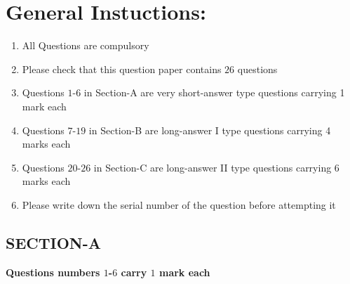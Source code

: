 \documentclass[a4paper,12pt]{article}
\begin{document}
\section*{\textbf{General Instuctions: }}
\begin{enumerate}[label=(\roman*)]
    \item All Questions are compulsory
    \item Please check that this question paper contains $26$ questions 
    \item Questions $1$-$6$ in Section-A are very short-answer type questions carrying 1 mark each
    \item Questions $7$-$19$ in Section-B are long-answer I type questions carrying 4 marks each
    \item Questions $20$-$26$ in Section-C are long-answer II type questions carrying 6 marks each
    \item Please write down the serial number of the question before attempting it
\end{enumerate}
\begin{center}
	\section*{\large \textbf{SECTION-A}}
	\textbf{Questions numbers $1$-$6$ carry $1$ mark each}
\end{center}
\vspace{1em}
\end{document}
